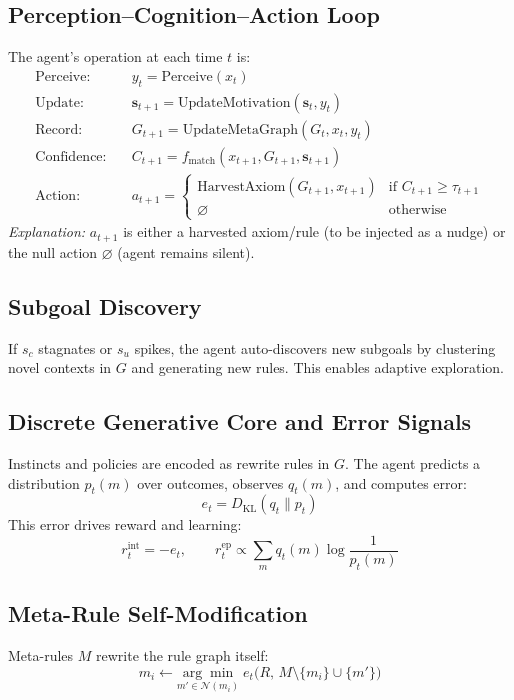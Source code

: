 \documentclass[11pt]{article}
\begin{document}
\subsection{Perception--Cognition--Action Loop}
The agent's operation at each time $t$ is:
\begin{align*}
  \text{Perceive:} &\quad y_t = \mathrm{Perceive}(x_t) \\
  \text{Update:} &\quad \mathbf{s}_{t+1} = \mathrm{UpdateMotivation}(\mathbf{s}_t, y_t) \\
  \text{Record:} &\quad G_{t+1} = \mathrm{UpdateMetaGraph}(G_t, x_t, y_t) \\
  \text{Confidence:} &\quad C_{t+1} = f_\mathrm{match}(x_{t+1}, G_{t+1}, \mathbf{s}_{t+1}) \\
  \text{Action:} &\quad a_{t+1} = \begin{cases}
    \mathrm{HarvestAxiom}(G_{t+1}, x_{t+1}) & \text{if } C_{t+1} \geq \tau_{t+1} \\
    \varnothing & \text{otherwise}
  \end{cases}
\end{align*}
\textit{Explanation:} $a_{t+1}$ is either a harvested axiom/rule (to be injected as a nudge) or the null action $\varnothing$ (agent remains silent).
\subsection{Subgoal Discovery}
If $s_c$ stagnates or $s_u$ spikes, the agent auto-discovers new subgoals by clustering novel contexts in $G$ and generating new rules. This enables adaptive exploration.

\subsection{Discrete Generative Core and Error Signals}
Instincts and policies are encoded as rewrite rules in $G$. The agent predicts a distribution $p_t(m)$ over outcomes, observes $q_t(m)$, and computes error:
\[
  e_t = D_{\mathrm{KL}}(q_t\|p_t)
\]
This error drives reward and learning:
\[
  r^{\mathrm{int}}_t = -e_t, \qquad r^{\mathrm{ep}}_t \propto \sum_m q_t(m)\log\frac{1}{p_t(m)}
\]

\subsection{Meta-Rule Self-Modification}
Meta-rules $M$ rewrite the rule graph itself:
\[
  m_i \leftarrow \underset{m'\in\mathcal{N}(m_i)}{\arg\min}\;e_t\bigl(R,\,M\setminus\{m_i\}\cup\{m'\}\bigr)
\]
\end{document}

